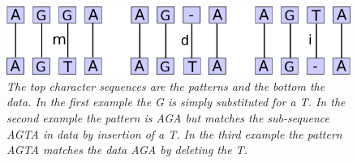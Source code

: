 \documentclass[12pt]{article}
\begin{document}
\begin{figure}[H]
\begin{center}
\includegraphics[scale=0.6]{Diagrams/midex.png}
\end{center}
\caption{\textit{The top character sequences are the patterns and the bottom the data. In the first example the G is simply
substituted for a T. In the second example the pattern is AGA but matches the sub-sequence AGTA in data by insertion of a
T. In the third example the pattern AGTA matches the data AGA by deleting the T.}}
\end{figure}
\end{document}
